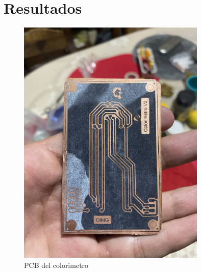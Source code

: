 \documentclass[12pt]{report}
\begin{document}
\section{Resultados}
  \begin{figure}[H]
      \centering
      \includegraphics[width=0.8\textwidth]{screenshots/imgFinal.jpg}
      \caption{PCB del colorimetro }
      \label{fig:PCB}
  \end{figure}




\newpage
\end{document}
